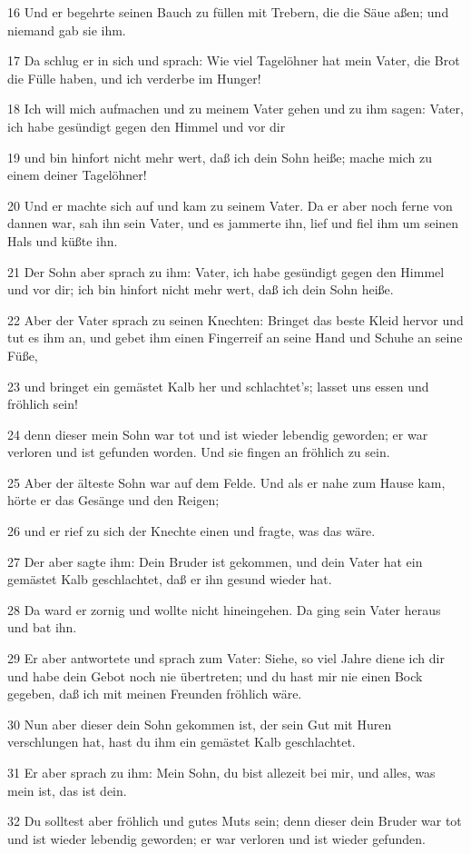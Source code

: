 \par 16 Und er begehrte seinen Bauch zu füllen mit Trebern, die die Säue aßen; und niemand gab sie ihm.
\par 17 Da schlug er in sich und sprach: Wie viel Tagelöhner hat mein Vater, die Brot die Fülle haben, und ich verderbe im Hunger!
\par 18 Ich will mich aufmachen und zu meinem Vater gehen und zu ihm sagen: Vater, ich habe gesündigt gegen den Himmel und vor dir
\par 19 und bin hinfort nicht mehr wert, daß ich dein Sohn heiße; mache mich zu einem deiner Tagelöhner!
\par 20 Und er machte sich auf und kam zu seinem Vater. Da er aber noch ferne von dannen war, sah ihn sein Vater, und es jammerte ihn, lief und fiel ihm um seinen Hals und küßte ihn.
\par 21 Der Sohn aber sprach zu ihm: Vater, ich habe gesündigt gegen den Himmel und vor dir; ich bin hinfort nicht mehr wert, daß ich dein Sohn heiße.
\par 22 Aber der Vater sprach zu seinen Knechten: Bringet das beste Kleid hervor und tut es ihm an, und gebet ihm einen Fingerreif an seine Hand und Schuhe an seine Füße,
\par 23 und bringet ein gemästet Kalb her und schlachtet's; lasset uns essen und fröhlich sein!
\par 24 denn dieser mein Sohn war tot und ist wieder lebendig geworden; er war verloren und ist gefunden worden. Und sie fingen an fröhlich zu sein.
\par 25 Aber der älteste Sohn war auf dem Felde. Und als er nahe zum Hause kam, hörte er das Gesänge und den Reigen;
\par 26 und er rief zu sich der Knechte einen und fragte, was das wäre.
\par 27 Der aber sagte ihm: Dein Bruder ist gekommen, und dein Vater hat ein gemästet Kalb geschlachtet, daß er ihn gesund wieder hat.
\par 28 Da ward er zornig und wollte nicht hineingehen. Da ging sein Vater heraus und bat ihn.
\par 29 Er aber antwortete und sprach zum Vater: Siehe, so viel Jahre diene ich dir und habe dein Gebot noch nie übertreten; und du hast mir nie einen Bock gegeben, daß ich mit meinen Freunden fröhlich wäre.
\par 30 Nun aber dieser dein Sohn gekommen ist, der sein Gut mit Huren verschlungen hat, hast du ihm ein gemästet Kalb geschlachtet.
\par 31 Er aber sprach zu ihm: Mein Sohn, du bist allezeit bei mir, und alles, was mein ist, das ist dein.
\par 32 Du solltest aber fröhlich und gutes Muts sein; denn dieser dein Bruder war tot und ist wieder lebendig geworden; er war verloren und ist wieder gefunden.

